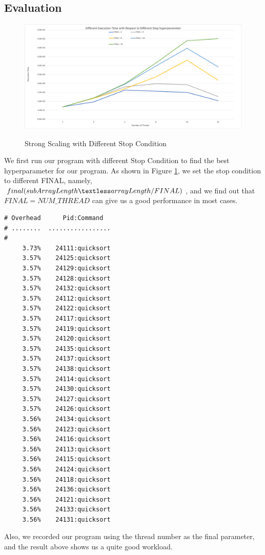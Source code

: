 \documentclass[article]{scrartcl}
\begin{document}
\subsection{Evaluation}
\begin{figure}[ht]
    \centering
    \includegraphics[width=.99\linewidth]{../figs/Final_hyper.png}  
    \label{fig:final_hyper}
    \caption{Strong Scaling with Different Stop Condition}
\end{figure}
We first run our program with different Stop Condition to find the best hyperparameter for our program.
As shown in Figure \ref{fig:final_hyper}, we set the stop condition to different FINAL,
namely, $final(subArrayLength \textless arrayLength/FINAL)$, and we find out that $FINAL = NUM\_THREAD$ can give us a good performance in most cases.\\
\begin{lstlisting}[frame=single]
# Overhead      Pid:Command  
# ........  .................
#
     3.73%    24111:quicksort
     3.57%    24125:quicksort
     3.57%    24129:quicksort
     3.57%    24128:quicksort
     3.57%    24132:quicksort
     3.57%    24112:quicksort
     3.57%    24122:quicksort
     3.57%    24117:quicksort
     3.57%    24119:quicksort
     3.57%    24120:quicksort
     3.57%    24135:quicksort
     3.57%    24137:quicksort
     3.57%    24138:quicksort
     3.57%    24114:quicksort
     3.57%    24130:quicksort
     3.57%    24127:quicksort
     3.57%    24126:quicksort
     3.56%    24134:quicksort
     3.56%    24123:quicksort
     3.56%    24116:quicksort
     3.56%    24113:quicksort
     3.56%    24115:quicksort
     3.56%    24124:quicksort
     3.56%    24118:quicksort
     3.56%    24136:quicksort
     3.56%    24121:quicksort
     3.56%    24133:quicksort
     3.56%    24131:quicksort
\end{lstlisting}

Also, we recorded our program using the thread number as the final parameter, and the result above shows us a quite good workload.
\end{document}
